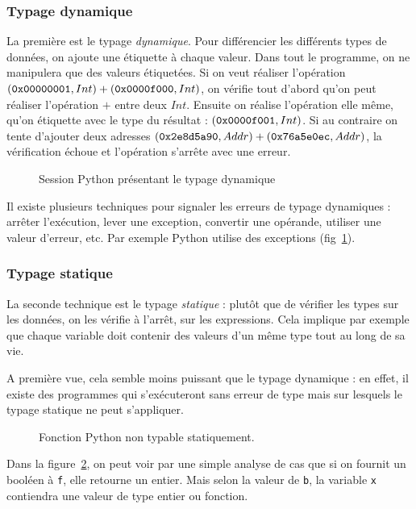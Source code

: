\subsubsection{Typage dynamique}

La première est le typage \emph{dynamique}. Pour différencier les différents
types de données, on ajoute une étiquette à chaque valeur. Dans tout le
programme, on ne manipulera que des valeurs étiquetées. Si on veut réaliser
l'opération $(\texttt{0x00000001}, Int) + (\texttt{0x0000f000}, Int)$, on vérifie tout
d'abord qu'on peut réaliser l'opération $+$ entre deux $Int$. Ensuite on réalise
l'opération elle même, qu'on étiquette avec le type du résultat :
$(\texttt{0x0000f001}, Int)$. Si au contraire on tente d'ajouter deux adresses
$(\texttt{0x2e8d5a90}, Addr) + (\texttt{0x76a5e0ec}, Addr)$, la vérification échoue et
l'opération s'arrête avec une erreur.

\begin{figure}
  \caption{Session Python présentant le typage dynamique}
  \label{fig:typage-dynamique}
\end{figure}

Il existe plusieurs techniques pour signaler les erreurs de typage dynamiques :
arrêter l'exécution, lever une exception, convertir une opérande, utiliser une
valeur d'erreur, etc. Par exemple Python utilise des exceptions
(fig~\ref{fig:typage-dynamique}).

\subsubsection{Typage statique}

La seconde technique est le typage \emph{statique} : plutôt que de vérifier les
types sur les données, on les vérifie à l'arrêt, sur les expressions. Cela
implique par exemple que chaque variable doit contenir des valeurs d'un même
type tout au long de sa vie.

A première vue, cela semble moins puissant que le typage dynamique : en effet,
il existe des programmes qui s'exécuteront sans erreur de type mais sur lesquels
le typage statique ne peut s'appliquer.

\begin{figure}
  \caption{Fonction Python non typable statiquement.}
  \label{fig:nontypable}
\end{figure}

Dans la figure~\ref{fig:nontypable}, on peut voir par une simple analyse de cas
que si on fournit un booléen à \texttt{f}, elle retourne un entier. Mais selon
la valeur de \texttt{b}, la variable \texttt{x} contiendra une valeur de type
entier ou fonction.

